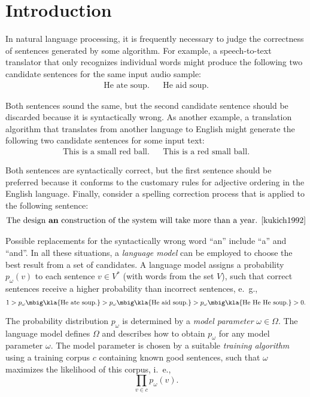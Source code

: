 \chapter{Introduction}

In natural language processing, it is frequently necessary to judge the
correctness of sentences generated by some algorithm. For example, a
speech-to-text translator that only recognizes individual words might produce
the following two candidate sentences for the same input audio sample:
\begin{align*}
 \text{He ate soup.} &&
 \text{He aid soup.}
\end{align*}

Both sentences sound the same, but the second candidate sentence should be
discarded because it is syntactically wrong. As another example, a translation
algorithm that translates from another language to English might generate the
following two candidate sentences for some input text:
\begin{align*}
 \text{This is a small red ball.} &&
 \text{This is a red small ball.}
\end{align*}

Both sentences are syntactically correct, but the first sentence should be
preferred because it conforms to the customary rules for adjective ordering in
the English language. Finally, consider a spelling correction process that is
applied to the following sentence:
\begin{align*}
 \text{The design \textbf{an} construction of the system will take more than a year. \cite{kukich1992}}
\end{align*}

Possible replacements for the syntactically wrong word ``an'' include ``a'' and
``and''. In all these situations, a \emph{language model} can be employed to
choose the best result from a set of candidates.
\cite{stolcke2002,youngetal2005} A language model assigns a probability $p_\omega(v)$
to each sentence $v\in V^*$ (with words from the set $V$), such that
correct sentences receive a higher probability than incorrect sentences, e.~g.,
\[
 1 > p_\omega\mbig\kla{\text{He ate soup.}} > p_\omega\mbig\kla{\text{He aid soup.}} > p_\omega\mbig\kla{\text{He He He soup.}} > 0.
\]

The probability distribution $p_\omega$ is determined by a \emph{model
parameter} $\omega\in\Omega$. The language model defines $\Omega$ and describes
how to obtain $p_\omega$ for any model parameter $\omega$. The model parameter
is chosen by a suitable \emph{training algorithm} using a training corpus $c$
containing known good sentences, such that $\omega$ maximizes the likelihood of
this corpus, i.~e.,
\[
 \prod_{v\in c} p_\omega(v).
\]

